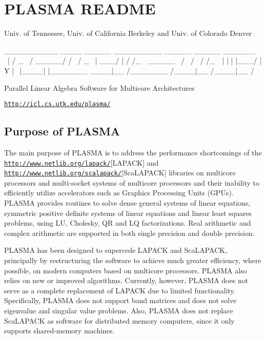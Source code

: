 \section*{P\+L\+A\+S\+M\+A R\+E\+A\+D\+M\+E }

Univ. of Tennessee, Univ. of California Berkeley and Univ. of Colorado Denver \begin{DoxyVerb} __________ ____       _____    _________   _____      _____
 \______   \    |     /  _  \  /   _____/  /     \    /  _  \
  |     ___/    |    /  /_\  \ \_____  \  /  \ /  \  /  /_\  \
  |    |   |    |___/    |    \/        \/    Y    \/    |    \
  |____|   |_______ \____|__  /_______  /\____|__  /\____|__  /
                   \/       \/        \/         \/         \/
\end{DoxyVerb}


Parallel Linear Algebra Software for Multicore Architectures

\href{http://icl.cs.utk.edu/plasma/}{\tt http\+://icl.\+cs.\+utk.\+edu/plasma/}

\subsection*{Purpose of P\+L\+A\+S\+M\+A }

The main purpose of P\+L\+A\+S\+M\+A is to address the performance shortcomings of the \href{http://www.netlib.org/lapack/}{\tt http\+://www.\+netlib.\+org/lapack/}\mbox{[}L\+A\+P\+A\+C\+K\mbox{]} and \href{http://www.netlib.org/scalapack/}{\tt http\+://www.\+netlib.\+org/scalapack/}\mbox{[}Sca\+L\+A\+P\+A\+C\+K\mbox{]} libraries on multicore processors and multi-\/socket systems of multicore processors and their inability to efficiently utilize accelerators such as Graphics Processing Units (G\+P\+Us). P\+L\+A\+S\+M\+A provides routines to solve dense general systems of linear equations, symmetric positive definite systems of linear equations and linear least squares problems, using L\+U, Cholesky, Q\+R and L\+Q factorizations. Real arithmetic and complex arithmetic are supported in both single precision and double precision.

P\+L\+A\+S\+M\+A has been designed to supercede L\+A\+P\+A\+C\+K and Sca\+L\+A\+P\+A\+C\+K, principally by restructuring the software to achieve much greater efficiency, where possible, on modern computers based on multicore processors. P\+L\+A\+S\+M\+A also relies on new or improved algorithms. Currently, however, P\+L\+A\+S\+M\+A does not serve as a complete replacement of L\+A\+P\+A\+C\+K due to limited functionality. Specifically, P\+L\+A\+S\+M\+A does not support band matrices and does not solve eigenvalue and singular value problems. Also, P\+L\+A\+S\+M\+A does not replace Sca\+L\+A\+P\+A\+C\+K as software for distributed memory computers, since it only supports shared-\/memory machines.

